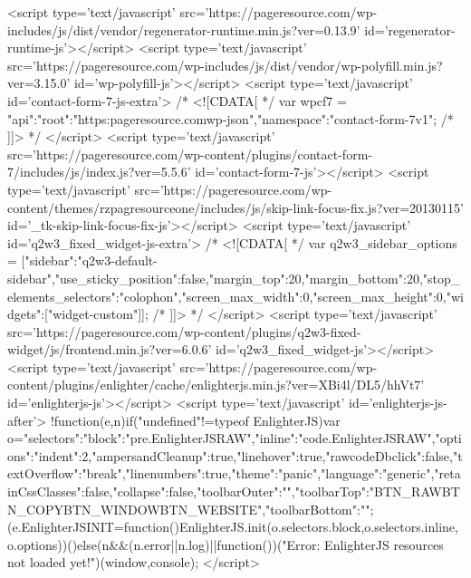 {<script type='text/javascript' src='https://pageresource.com/wp-includes/js/dist/vendor/regenerator-runtime.min.js?ver=0.13.9' id='regenerator-runtime-js'></script>
<script type='text/javascript' src='https://pageresource.com/wp-includes/js/dist/vendor/wp-polyfill.min.js?ver=3.15.0' id='wp-polyfill-js'></script>
<script type='text/javascript' id='contact-form-7-js-extra'>
/* <![CDATA[ */
var wpcf7 = {"api":{"root":"https:\/\/pageresource.com\/wp-json\/","namespace":"contact-form-7\/v1"}};
/* ]]> */
</script>
<script type='text/javascript' src='https://pageresource.com/wp-content/plugins/contact-form-7/includes/js/index.js?ver=5.5.6' id='contact-form-7-js'></script>
<script type='text/javascript' src='https://pageresource.com/wp-content/themes/rzpagresourceone/includes/js/skip-link-focus-fix.js?ver=20130115' id='_tk-skip-link-focus-fix-js'></script>
<script type='text/javascript' id='q2w3_fixed_widget-js-extra'>
/* <![CDATA[ */
var q2w3_sidebar_options = [{"sidebar":"q2w3-default-sidebar","use_sticky_position":false,"margin_top":20,"margin_bottom":20,"stop_elements_selectors":"colophon","screen_max_width":0,"screen_max_height":0,"widgets":["widget-custom"]}];
/* ]]> */
</script>
<script type='text/javascript' src='https://pageresource.com/wp-content/plugins/q2w3-fixed-widget/js/frontend.min.js?ver=6.0.6' id='q2w3_fixed_widget-js'></script>
<script type='text/javascript' src='https://pageresource.com/wp-content/plugins/enlighter/cache/enlighterjs.min.js?ver=XBi4l/DL5/hhVt7' id='enlighterjs-js'></script>
<script type='text/javascript' id='enlighterjs-js-after'>
!function(e,n){if("undefined"!=typeof EnlighterJS){var o={"selectors":{"block":"pre.EnlighterJSRAW","inline":"code.EnlighterJSRAW"},"options":{"indent":2,"ampersandCleanup":true,"linehover":true,"rawcodeDbclick":false,"textOverflow":"break","linenumbers":true,"theme":"panic","language":"generic","retainCssClasses":false,"collapse":false,"toolbarOuter":"","toolbarTop":"{BTN_RAW}{BTN_COPY}{BTN_WINDOW}{BTN_WEBSITE}","toolbarBottom":""}};(e.EnlighterJSINIT=function(){EnlighterJS.init(o.selectors.block,o.selectors.inline,o.options)})()}else{(n&&(n.error||n.log)||function(){})("Error: EnlighterJS resources not loaded yet!")}}(window,console);
</script>
}
